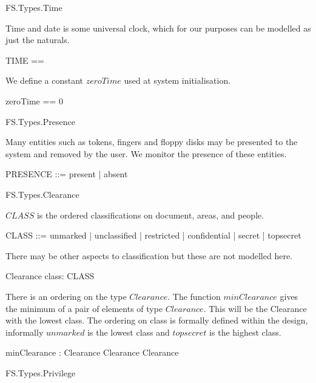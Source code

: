 \begin{traceunit}{FS.Types.Time}
\end{traceunit}

Time and date is some universal clock,
which for our purposes can be modelled as just the naturals.
\begin{zed}
	TIME == \nat
\end{zed}

We define a constant $zeroTime$ used at system initialisation.

\begin{zed}
        zeroTime == 0
\end{zed}

\begin{traceunit}{FS.Types.Presence}
\end{traceunit}

Many entities such as tokens, fingers and floppy disks may be
presented to the system and removed by the user. We monitor the
presence of these entities.
\begin{zed}
	PRESENCE ::= present | absent
\end{zed}

\begin{traceunit}{FS.Types.Clearance}
\end{traceunit}


$CLASS$ is the ordered classifications on document, areas, and people.
\begin{zed}
	CLASS ::=  unmarked | unclassified | restricted | confidential |
		secret | topsecret
\end{zed}

There may be other aspects to classification but these are not
modelled here.

\begin{schema}{Clearance}
	class: CLASS
\end{schema}

There is an ordering on the type $Clearance$. The function
$minClearance$  gives the minimum of a
pair of elements of type $Clearance$. This will be the Clearance with
the lowest class. The ordering on class is formally defined within the
design, informally $unmarked$ is the lowest class and $topsecret$ is
the highest class. 

\begin{axdef}
        minClearance : Clearance \cross Clearance \fun Clearance
\end{axdef}

\begin{traceunit}{FS.Types.Privilege}
\end{traceunit}


